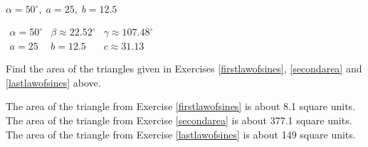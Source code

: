 \documentclass{ximera}
\begin{document}
\begin{question}
\begin{problem} \label{lastlawofsines}
$\alpha = 50^{\circ}, \; a = 25, \; b = 12.5$

\begin{solution}
$\begin{array}{lll}
\alpha = 50^{\circ} & \beta \approx 22.52^{\circ} & \gamma \approx 107.48^{\circ} \\
a = 25 & b = 12.5 & c \approx 31.13 \end{array}$
\end{solution}
\end{problem}


\end{question}

\begin{problem}
Find the area of the triangles given in Exercises \ref{firstlawofsines}, \ref{secondarea} and \ref{lastlawofsines} above.

\begin{solution}
The area of the triangle from Exercise \ref{firstlawofsines} is about 8.1 square units.\\
The area of the triangle from Exercise \ref{secondarea} is about 377.1 square units.\\
The area of the triangle from Exercise \ref{lastlawofsines} is about 149 square units.
\end{solution}
\end{problem}
\end{document}
